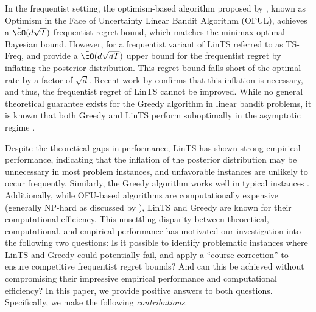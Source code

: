 In the frequentist setting, the optimism-based algorithm proposed by \cite{abbasi2011improved}, known as Optimism in the Face of Uncertainty Linear Bandit Algorithm (OFUL), achieves a $\tilde{\cO}(d\sqrt{T})$ frequentist regret bound, which matches the minimax optimal Bayesian bound. However, for a frequentist variant of LinTS referred to as TS-Freq, \cite{agrawal2013thompson} and \cite{abeille2017linear} provide a $\tilde{\cO}(d\sqrt{dT})$ upper bound for the frequentist regret by inflating the posterior distribution. This regret bound falls short of the optimal rate by a factor of $\sqrt{d}$. Recent work by \citet{hamidi2020frequentist} confirms that this inflation is necessary, and thus, the frequentist regret of LinTS cannot be improved. While no general theoretical guarantee exists for the Greedy algorithm in linear bandit problems, it is known that both Greedy and LinTS perform suboptimally in the asymptotic regime \citep{lattimore2017end}.

Despite the theoretical gaps in performance, LinTS has shown strong empirical performance, indicating that the inflation of the posterior distribution may be unnecessary in most problem instances, and unfavorable instances are unlikely to occur frequently. Similarly, the Greedy algorithm works well in typical instances 
\citep{bietti2021contextual}. Additionally, while OFU-based algorithms are computationally expensive (generally NP-hard as discussed by \cite{dani2008stochastic,russo2014learning,agrawal2019recent}), LinTS and Greedy are known for their computational efficiency. This unsettling disparity between theoretical, computational, and empirical performance has motivated our investigation into the following two questions:  Is it possible to identify problematic instances where LinTS and Greedy could potentially fail, and apply a ``course-correction'' to ensure competitive frequentist regret bounds? And can this be achieved without compromising their impressive empirical performance and computational efficiency?
%
In this paper, we provide positive answers to both questions. Specifically, we make the following \emph{contributions}. 

